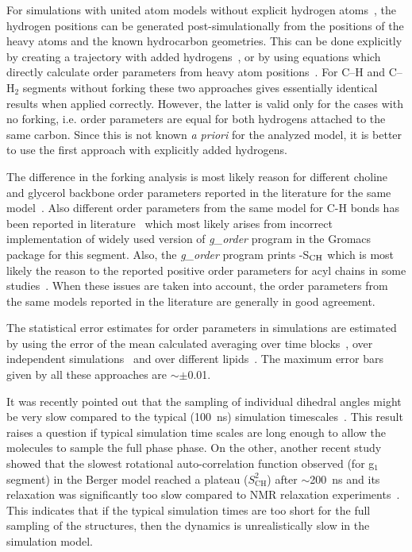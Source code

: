 \documentclass[aps,prl,superscriptaddress,twocolumn]{revtex4}
\begin{document}
For simulations with united atom models without explicit hydrogen atoms~\cite{ollila07a,vermeer07,botan15}, the hydrogen positions 
can be generated post-simulationally from the positions of the heavy atoms and the known hydrocarbon geometries.
This can be done explicitly by creating a trajectory with added hydrogens~\cite{ollila07a,botan15}, or by using equations
which directly calculate order parameters from heavy atom positions~\cite{tieleman97,vermeer07}.
For C--H and C--H$_2$ segments without forking these two approaches gives essentially identical results
when applied correctly. However, the latter is valid only for the cases with no forking, i.e. order 
parameters are equal for both hydrogens attached to the same carbon. Since this is not known {\it a priori}
for the analyzed model, it is better to use the first approach with explicitly added hydrogens.

The difference in the forking analysis is most likely reason for different choline and glycerol
backbone order parameters reported in the literature for the same model~\cite{poger12,botan15}.
Also different order parameters from the same model for C-H bonds has been reported in literature~\cite{bachar04,ollila07a}
which most likely arises from incorrect implementation of widely used version of {\it g\_order} program in the Gromacs package
for this segment. Also, the {\it g\_order} program prints -S$_{{\rm CH}}$ which is most likely the reason to
the reported positive order parameters for acyl chains in some studies~\cite{ekkabut07}.
When these issues are taken into account, the order parameters from the same models reported in the
literature are generally in good agreement.

The statistical error estimates for order parameters in simulations are estimated by
using the error of the mean calculated averaging over time blocks~\cite{ollila07a}, over independent 
simulations~\cite{poger12} and over different lipids~\cite{botan15}. The maximum error bars given by
all these approaches are $\sim \pm$0.01.

It was recently pointed out that the sampling of individual dihedral angles might be very
slow compared to the typical (100~ns) simulation timescales~\cite{vogel12}.
This result raises a question if typical simulation time scales are long enough to allow
the molecules to sample the full phase phase. On the other, another recent study showed
that the slowest rotational auto-correlation function observed (for g$_1$ segment) 
in the Berger model reached a plateau ($S_\mathrm{CH}^2$) after $\sim$200~ns
and its relaxation was significantly too slow compared to NMR relaxation experiments~\cite{ferreira15}. 
This indicates that if the typical simulation times are too short for the full sampling
of the structures, then the dynamics is unrealistically slow in the simulation model.
\end{document}
